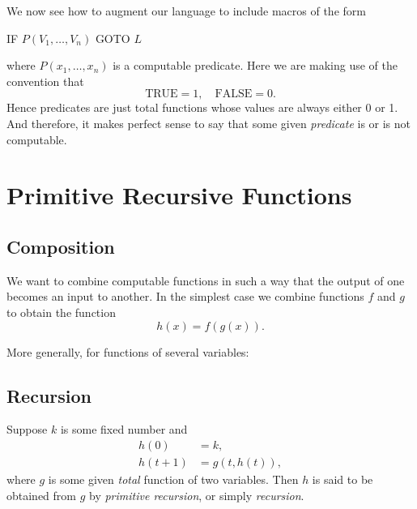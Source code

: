 \documentclass[12pt,a4paper,twoside,openany]{book}
\begin{document}
We now see how to augment our language to include macros of the form
\begin{center}
    IF $P(V_1,\ldots,V_n)$ GOTO $L$
\end{center}
where $P(x_1,\ldots,x_n)$ is a computable predicate. Here we are making use of the convention that $$\text{TRUE}=1,\quad\text{FALSE}=0.$$ Hence predicates are just total functions whose values are always either 0 or 1. And therefore, it makes perfect sense to say that some given \textit{predicate} is or is not computable.

\chapter{Primitive Recursive Functions}
\section{Composition}

We want to combine computable functions in such a way that the output of one becomes an input to another. In the simplest case we combine functions $f$ and $g$ to obtain the function $$h(x)=f(g(x)).$$

More generally, for functions of several variables:



\section{Recursion}

Suppose $k$ is some fixed number and
\begin{equation}
    \begin{aligned}h(0)&=k,\\h(t+1)&=g(t,h(t)),\end{aligned}
    \label{2.1}
\end{equation}
where $g$ is some given \textit{total} function of two variables. Then $h$ is said to be obtained from $g$ by \textit{primitive recursion}, or simply \textit{recursion}.
\end{document}
